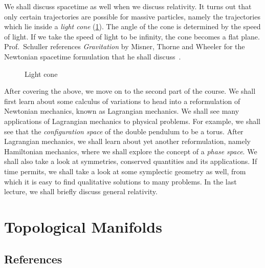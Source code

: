 \documentclass[a4 paper, 11pt]{book}
\theoremstyle{definition}
\begin{document}
    We shall discuss spacetime as well when we discuss relativity. It turns out that only certain trajectories are possible for massive particles, namely the trajectories which lie inside a \textit{light cone} (\cref{fig:lightcone}). The angle of the cone is determined by the speed of light. If we take the speed of light to be infinity, the cone becomes a flat plane. Prof.\ Schuller references \textit{Gravitation} by Misner, Thorne and Wheeler for the Newtonian spacetime formulation that he shall discuss~\cite{Misner}.

    \begin{figure}[htb]
        \centering
        \caption{Light cone}
        \label{fig:lightcone}
    \end{figure}

    After covering the above, we move on to the second part of the course. We shall first learn about some calculus of variations to head into a reformulation of Newtonian mechanics, known as Lagrangian mechanics. We shall see many applications of Lagrangian mechanics to physical problems. For example, we shall see that the \textit{configuration space} of the double pendulum to be a torus. After Lagrangian mechanics, we shall learn about yet another reformulation, namely Hamiltonian mechanics, where we shall explore the concept of a \textit{phase space}. We shall also take a look at symmetries, conserved quantities and its applications. If time permits, we shall take a look at some symplectic geometry as well, from which it is easy to find qualitative solutions to many problems. In the last lecture, we shall briefly discuss general relativity.

    \chapter{Topological Manifolds}

    \section{References}
\end{document}
